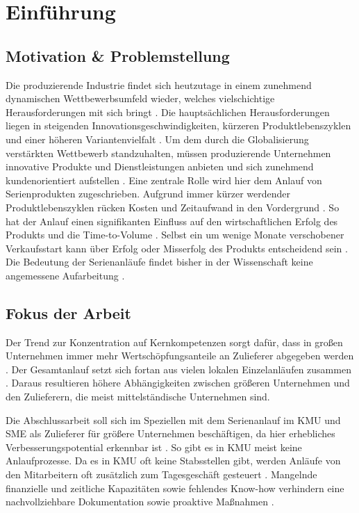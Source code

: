 \chapter{Einführung}\label{sec:einfuehrung}
\section{Motivation \& Problemstellung}
Die produzierende Industrie findet sich heutzutage in einem zunehmend dynamischen Wettbewerbsumfeld wieder, welches vielschichtige Herausforderungen mit sich bringt \cite{Renner2012}. Die hauptsächlichen Herausforderungen liegen in steigenden Innovationsgeschwindigkeiten, kürzeren Produktlebenszyklen und einer höheren Variantenvielfalt \cite{Kuhn2002,Stauder2016}. Um dem durch die Globalisierung verstärkten Wettbewerb standzuhalten, müssen produzierende Unternehmen innovative Produkte und Dienstleistungen anbieten und sich zunehmend kundenorientiert aufstellen \cite{Surbier2014}. 
Eine zentrale Rolle wird hier dem Anlauf von Serienprodukten zugeschrieben. Aufgrund immer kürzer werdender Produktlebenszyklen rücken Kosten und Zeitaufwand in den Vordergrund \cite{Winkler2007}. So hat der Anlauf einen signifikanten Einfluss auf den wirtschaftlichen Erfolg des Produkts und die Time-to-Volume \cite{Klocke16}. Selbst ein um wenige Monate verschobener Verkaufsstart kann über Erfolg oder Misserfolg des Produkts entscheidend sein \cite{Schuh2008a}. Die Bedeutung der Serienanläufe findet bisher in der Wissenschaft keine angemessene Aufarbeitung \cite{Dyckhoff2012}. 

\section{Fokus der Arbeit}
Der Trend zur Konzentration auf Kernkompetenzen sorgt dafür, dass in großen Unternehmen immer mehr Wertschöpfungsanteile an Zulieferer abgegeben werden  \cite{Hilmola2015, Wildemann2008}. Der Gesamtanlauf setzt sich fortan aus vielen lokalen Einzelanläufen zusammen \cite{Zimolong2006}. Daraus resultieren höhere Abhängigkeiten zwischen größeren Unternehmen und den Zulieferern, die meist mittelständische Unternehmen sind. 

Die Abschlussarbeit soll sich im Speziellen mit dem Serienanlauf im KMU und SME als Zulieferer für größere Unternehmen beschäftigen, da hier erhebliches Verbesserungspotential erkennbar ist \cite[S.18]{Dombrowski2009a}. So gibt es in KMU meist keine Anlaufprozesse. Da es in KMU oft keine Stabsstellen gibt, werden Anläufe von den Mitarbeitern oft zusätzlich zum Tagesgeschäft gesteuert \cite{Dombrowski2009}. %
Mangelnde finanzielle und zeitliche Kapazitäten sowie fehlendes Know-how verhindern eine nachvollziehbare Dokumentation sowie proaktive Maßnahmen \cite{Zimolong2006,Dombrowski2009a}. 

